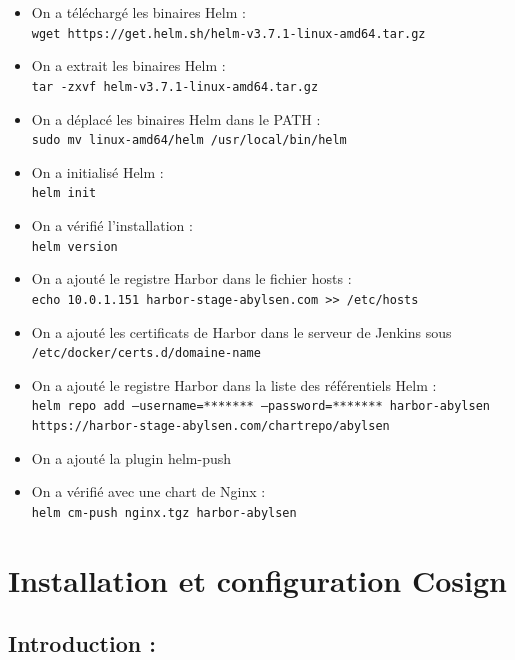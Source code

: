 \begin{itemize}
\item On a téléchargé les binaires Helm : \\
\texttt{wget https://get.helm.sh/helm-v3.7.1-linux-amd64.tar.gz}

\item On a extrait les binaires Helm : \\
\texttt{tar -zxvf helm-v3.7.1-linux-amd64.tar.gz}

\item On a déplacé les binaires Helm dans le PATH : \\
\texttt{sudo mv linux-amd64/helm /usr/local/bin/helm}

\item On a initialisé Helm : \\
\texttt{helm init}

\item On a vérifié l’installation : \\
\texttt{helm version}

\item On a ajouté le registre Harbor dans le fichier hosts : \\
\texttt{echo 10.0.1.151 harbor-stage-abylsen.com >> /etc/hosts}

\item On a ajouté les certificats de Harbor dans le serveur de Jenkins sous \\
\texttt{/etc/docker/certs.d/domaine-name}

\item On a ajouté le registre Harbor dans la liste des référentiels Helm : \\
\texttt{helm repo add --username=******* --password=******* harbor-abylsen https://harbor-stage-abylsen.com/chartrepo/abylsen}

\item On a ajouté la plugin helm-push

\item On a vérifié avec une chart de Nginx : \\
\texttt{helm cm-push nginx.tgz harbor-abylsen}
\end{itemize}

\section*{Installation et configuration Cosign}

\subsection*{Introduction :}

